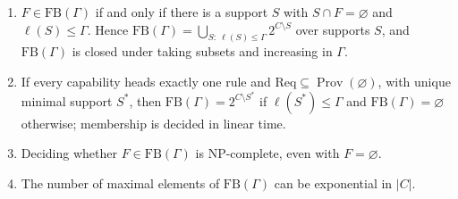 \begin{newresult}\label{thm:fallback}
\begin{enumerate}[nosep,label=(\alph*)]
  \item $F\in\mathrm{FB}(\Gamma)$ if and only if there is a support $S$ with $S\cap F=\varnothing$ and $\ell(S)\le\Gamma$. Hence $\mathrm{FB}(\Gamma)=\bigcup_{S:\ \ell(S)\le\Gamma}2^{C\setminus S}$ over supports $S$, and $\mathrm{FB}(\Gamma)$ is closed under taking subsets and increasing in $\Gamma$.
  \item If every capability heads exactly one rule and $\mathrm{Req}\subseteq\operatorname{Prov}(\varnothing)$, with unique minimal support $S^{*}$, then $\mathrm{FB}(\Gamma)=2^{C\setminus S^{*}}$ if $\ell(S^{*})\le\Gamma$ and $\mathrm{FB}(\Gamma)=\varnothing$ otherwise; membership is decided in linear time.
  \item Deciding whether $F\in\mathrm{FB}(\Gamma)$ is NP-complete, even with $F=\varnothing$.
  \item The number of maximal elements of $\mathrm{FB}(\Gamma)$ can be exponential in $|C|$.
\end{enumerate}
\end{newresult}
